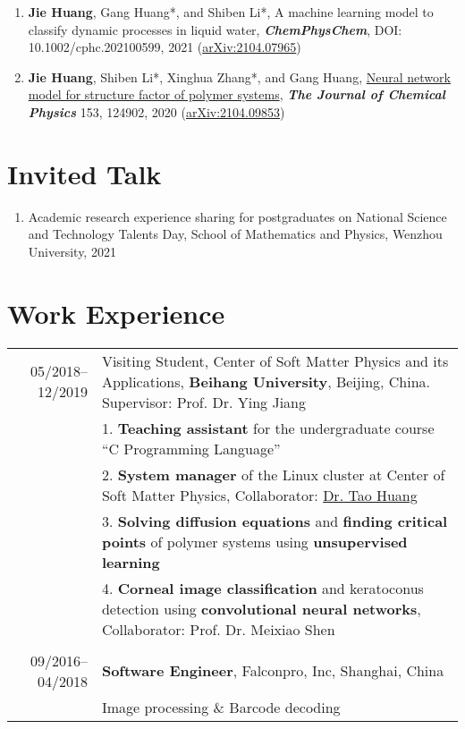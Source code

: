 \documentclass[a4paper,10pt]{article} %
\begin{document}
\begin{small}
\begin{enumerate}
\item \textbf{Jie Huang}, Gang Huang*, and Shiben Li*, A machine learning model to classify dynamic processes in liquid water,   \textbf{\emph{ChemPhysChem}}, DOI: 10.1002/cphc.202100599,  2021 (\href{https://arxiv.org/abs/2104.07965}{arXiv:2104.07965})

\item \textbf{Jie Huang}, Shiben Li*, Xinghua Zhang*, and Gang Huang, \href{https://aip.scitation.org/doi/10.1063/5.0022464}{Neural network model for structure factor of polymer systems},  \textbf{\emph{The Journal of Chemical Physics}} 153, 124902, 2020 (\href{https://arxiv.org/abs/2104.09853}{arXiv:2104.09853})
\end{enumerate}
\end{small}

\section{Invited Talk}  
\begin{small}
	\begin{enumerate}
		\item Academic research experience sharing for postgraduates on National Science and Technology Talents Day, School of Mathematics and Physics, Wenzhou University, 2021
	\end{enumerate}
\end{small}

\section{Work Experience}
\begin{tabular}{r|p{11cm}}
	05/2018--12/2019            & Visiting Student,  Center of Soft Matter Physics and its Applications, \textbf{Beihang University}, Beijing, China. Supervisor: Prof. Dr. Ying Jiang  \\
	& 1. \textbf{Teaching assistant} for the undergraduate course “C Programming Language” \\
	& 2. \textbf{System manager} of the Linux cluster at Center of Soft Matter Physics, Collaborator: \href{http://taohonker.science/}{Dr. Tao Huang}\\
	& 3. \textbf{Solving diffusion equations} and \textbf{finding critical points} of polymer systems using \textbf{unsupervised learning}\\
	& 4. \textbf{Corneal image classification} and keratoconus detection using \textbf{convolutional neural networks}, Collaborator: Prof. Dr. Meixiao Shen\\
	\multicolumn{2}{c}{} \\	%
	09/2016--04/2018            & \textbf{Software Engineer}, Falconpro, Inc, Shanghai, China \\                          & \footnotesize{Image processing \& Barcode} decoding					
\end{tabular}
\end{document}
